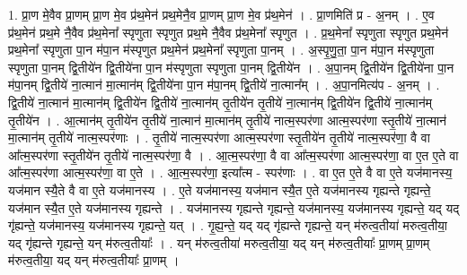 \documentclass[17pt]{extarticle}
\begin{document}
1. प्रा॒ण मे॒वैव प्रा॒णम् प्रा॒ण मे॒व प्र॑थ॒मेन॑ प्रथ॒मेनै॒व प्रा॒णम् प्रा॒ण मे॒व प्र॑थ॒मेन॑ । . प्रा॒णमिति॑ प्र - अ॒नम् । . ए॒व प्र॑थ॒मेन॑ प्रथ॒मे नै॒वैव प्र॑थ॒मेना᳚ स्पृणुता स्पृणुत प्रथ॒मे नै॒वैव प्र॑थ॒मेना᳚ स्पृणुत । . प्र॒थ॒मेना᳚ स्पृणुता स्पृणुत प्रथ॒मेन॑ प्रथ॒मेना᳚ स्पृणुता पा॒न म॑पा॒न म॑स्पृणुत प्रथ॒मेन॑ प्रथ॒मेना᳚ स्पृणुता पा॒नम् । . अ॒स्पृ॒णु॒ता॒ पा॒न म॑पा॒न म॑स्पृणुता स्पृणुता पा॒नम् द्वि॒तीये॑न द्वि॒तीये॑ना पा॒न म॑स्पृणुता स्पृणुता पा॒नम् द्वि॒तीये॑न । . अ॒पा॒नम् द्वि॒तीये॑न द्वि॒तीये॑ना पा॒न म॑पा॒नम् द्वि॒तीये॑ ना॒त्मान॑ मा॒त्मान॑म् द्वि॒तीये॑ना पा॒न म॑पा॒नम् द्वि॒तीये॑ ना॒त्मान᳚म् । . अ॒पा॒नमित्य॑प - अ॒नम् । . द्वि॒तीये॑ ना॒त्मान॑ मा॒त्मान॑म् द्वि॒तीये॑न द्वि॒तीये॑ ना॒त्मान॑म् तृ॒तीये॑न तृ॒तीये॑ ना॒त्मान॑म् द्वि॒तीये॑न द्वि॒तीये॑ ना॒त्मान॑म् तृ॒तीये॑न । . आ॒त्मान॑म् तृ॒तीये॑न तृ॒तीये॑ ना॒त्मान॑ मा॒त्मान॑म् तृ॒तीये॑ नात्म॒स्पर॑णा आत्म॒स्पर॑णा स्तृ॒तीये॑ ना॒त्मान॑ मा॒त्मान॑म् तृ॒तीये॑ नात्म॒स्पर॑णाः । . तृ॒तीये॑ नात्म॒स्पर॑णा आत्म॒स्पर॑णा स्तृ॒तीये॑न तृ॒तीये॑ नात्म॒स्पर॑णा॒ वै वा आ᳚त्म॒स्पर॑णा स्तृ॒तीये॑न तृ॒तीये॑ नात्म॒स्पर॑णा॒ वै । . आ॒त्म॒स्पर॑णा॒ वै वा आ᳚त्म॒स्पर॑णा आत्म॒स्पर॑णा॒ वा ए॒त ए॒ते वा आ᳚त्म॒स्पर॑णा आत्म॒स्पर॑णा॒ वा ए॒ते । . आ॒त्म॒स्पर॑णा॒ इत्या᳚त्म - स्पर॑णाः । . वा ए॒त ए॒ते वै वा ए॒ते यज॑मानस्य॒ यज॑मान स्यै॒ते वै वा ए॒ते यज॑मानस्य । . ए॒ते यज॑मानस्य॒ यज॑मान स्यै॒त ए॒ते यज॑मानस्य गृह्यन्ते गृह्यन्ते॒ यज॑मान स्यै॒त ए॒ते यज॑मानस्य गृह्यन्ते । . यज॑मानस्य गृह्यन्ते गृह्यन्ते॒ यज॑मानस्य॒ यज॑मानस्य गृह्यन्ते॒ यद् यद् गृ॑ह्यन्ते॒ यज॑मानस्य॒ यज॑मानस्य गृह्यन्ते॒ यत् । . गृ॒ह्य॒न्ते॒ यद् यद् गृ॑ह्यन्ते गृह्यन्ते॒ यन् म॑रुत्व॒तीया॑ मरुत्व॒तीया॒ यद् गृ॑ह्यन्ते गृह्यन्ते॒ यन् म॑रुत्व॒तीयाः᳚ । . यन् म॑रुत्व॒तीया॑ मरुत्व॒तीया॒ यद् यन् म॑रुत्व॒तीयाः᳚ प्रा॒णम् प्रा॒णम् म॑रुत्व॒तीया॒ यद् यन् म॑रुत्व॒तीयाः᳚ प्रा॒णम् । \newline
\end{document}
